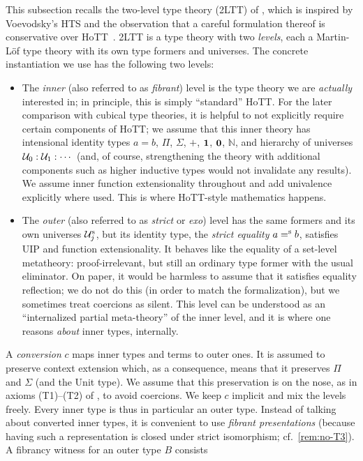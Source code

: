 This subsection recalls the two-level type theory (2LTT) of
\citet{2LTT}, which is inspired by Voevodsky's HTS \citep{HTS} and the observation that a careful formulation thereof is conservative over HoTT~\citep{Capriotti2017}.
2LTT is a type theory with two \emph{levels}, each a Martin-L\"of type
theory with its own type formers and universes.
The concrete instantiation we use has the following two levels:
\begin{itemize}[noitemsep]
	\item The \emph{inner} (also referred to as \emph{fibrant}) level is the type theory we are \emph{actually} interested in; in principle, this is simply ``standard'' HoTT.
	For the later comparison with cubical type theories, it is helpful to not explicitly require certain components of HoTT; we assume that this inner theory has intensional identity types $a=b$,
	$\Pi$, $\Sigma$, $+$, $\mathbf{1}$, $\mathbf{0}$, $\mathbb{N}$, and
	hierarchy of universes $\mathcal{U}_0:\mathcal{U}_1:\cdots$ (and, of course, strengthening the theory with additional components such as higher inductive types would not invalidate any results).
	We assume inner function
	extensionality throughout and add univalence explicitly where used.
	This is where HoTT-style mathematics happens.
	\item The \emph{outer} (also referred to as \emph{strict} or \emph{exo}) level has the
	same formers and its own universes $\mathcal{U}^\textup{s}_j$, but its identity type,
	the \emph{strict equality} $a\mathrel{=^\textup{s}} b$, satisfies UIP and function
	extensionality. 
	It behaves like the equality of a set-level metatheory:
	proof-irrelevant, but still an ordinary type former with the usual
	eliminator. On paper, it would be harmless to assume that it satisfies equality reflection; we do not do this (in order to match the formalization), but we sometimes treat coercions as silent.
	This level can be understood as an ``internalized partial meta-theory'' of the inner level, and it is where one
	reasons \emph{about} inner types, internally.
\end{itemize}
A \emph{conversion} $c$ maps inner types and terms to outer ones. It is assumed to preserve context extension which, as a consequence, means that it preserves $\Pi$ and $\Sigma$ (and the Unit type).
We assume that this preservation is on the nose, as in axioms (T1)--(T2) of
\citet{2LTT}, to avoid coercions.
We keep $c$ implicit and mix the levels
freely. Every inner type is thus in particular an outer type.
Instead of talking about converted inner types, it is convenient to use
\emph{fibrant presentations} (because having such a representation is closed under strict isomorphism; cf.~\cref{rem:no-T3}). A fibrancy witness for an outer type $B$ consists
